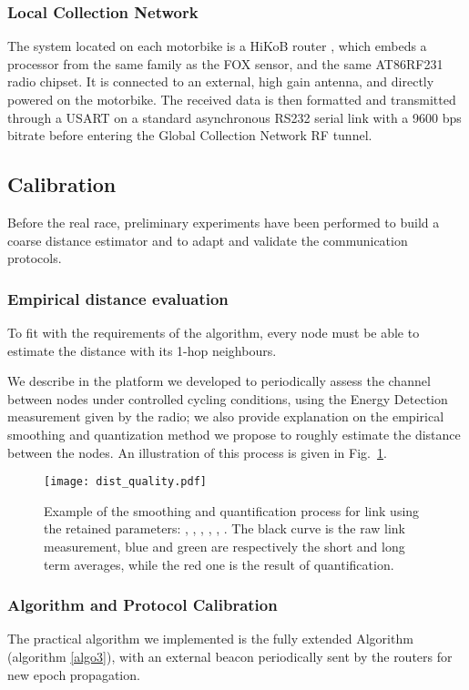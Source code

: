 \documentclass{sig-alternate}
\begin{document}
\subsubsection{Local Collection Network}
The system located on each motorbike is a HiKoB {\lion} router \cite{hikoblion}, which embeds a processor from the same family as the FOX sensor, and the same AT86RF231 radio chipset. It is connected to an external, high gain antenna, and directly powered on the motorbike. The received data is then formatted and transmitted through a USART on a standard asynchronous RS232 serial link with a 9600 bps bitrate before entering the Global Collection Network RF tunnel. 

\subsection{Calibration}
\label{sec:calib}
Before the real race, preliminary experiments have been performed to build a coarse distance estimator and to adapt and validate the communication protocols.

\subsubsection{Empirical distance evaluation}
\label{sec:calib_dist}
To fit with the requirements of the {\gmc} algorithm, every node must be able to estimate the distance with its 1-hop neighbours.


We describe in \cite{mobihoc} the platform we developed to periodically assess the channel between {\fox} nodes under controlled cycling conditions, using the Energy Detection measurement given by the radio; we also provide explanation on the empirical {\ed} smoothing and quantization method we propose to roughly estimate the distance between the nodes.
An illustration of this process is given in Fig.~\ref{fig:smooth_dist}.


\begin{figure}[t!]
\centering
\texttt{[image: dist\_quality.pdf]}
\caption{Example of the smoothing and quantification process for link  using the retained parameters:
, , , , , . The black curve is the raw link measurement, blue and green are respectively the short and long term averages, while the red one is the result of quantification.}
\label{fig:smooth_dist}
\end{figure}



\subsubsection{Algorithm and Protocol Calibration}
\label{sec:prot_calib}
The practical algorithm we implemented is the fully extended {\mgmc} Algorithm (algorithm \ref{algo3}), with an external beacon periodically sent by the {\lion} routers for new epoch propagation.
\end{document}
